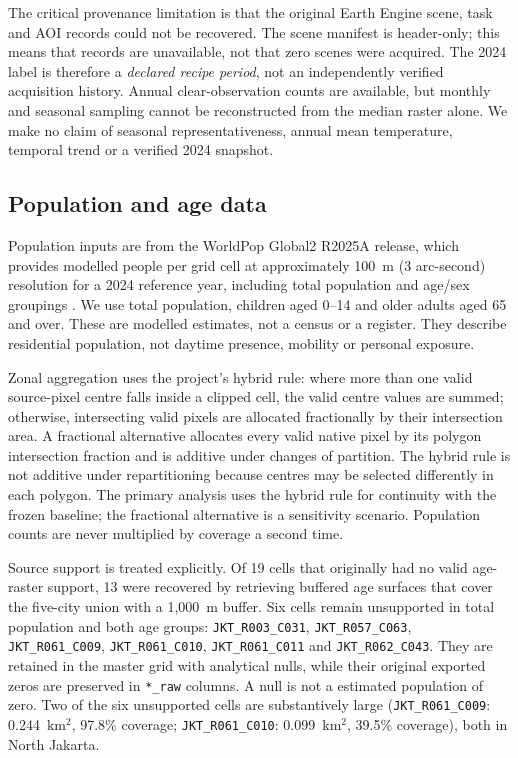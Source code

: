 \documentclass[times,twoside]{_Templates/MultiTargetManuscript}
\begin{document}
The critical provenance limitation is that the original Earth Engine scene,
task and AOI records could not be recovered. The scene manifest is header-only;
this means that records are unavailable, not that zero scenes were acquired.
The 2024 label is therefore a \emph{declared recipe period}, not an
independently verified acquisition history. Annual clear-observation counts are
available, but monthly and seasonal sampling cannot be reconstructed from the
median raster alone. We make no claim of seasonal representativeness, annual mean
temperature, temporal trend or a verified 2024 snapshot.

\subsection{Population and age data}

Population inputs are from the WorldPop Global2 R2025A release, which provides
modelled people per grid cell at approximately 100~m (3 arc-second) resolution
for a 2024 reference year, including total population and age/sex groupings
\citep{worldpop2025}. We use total population, children aged 0--14 and older
adults aged 65 and over. These are modelled estimates, not a census or a
register. They describe residential population, not daytime presence, mobility
or personal exposure.

Zonal aggregation uses the project's hybrid rule: where more than one valid
source-pixel centre falls inside a clipped cell, the valid centre values are
summed; otherwise, intersecting valid pixels are allocated fractionally by
their intersection area. A fractional alternative allocates every valid native
pixel by its polygon intersection fraction and is additive under changes of
partition. The hybrid rule is not additive under repartitioning because centres
may be selected differently in each polygon. The primary analysis uses the
hybrid rule for continuity with the frozen baseline; the fractional alternative
is a sensitivity scenario. Population counts are never multiplied by coverage a
second time.

Source support is treated explicitly. Of 19 cells that originally had no valid
age-raster support, 13 were recovered by retrieving buffered age surfaces that
cover the five-city union with a 1,000~m buffer. Six cells remain unsupported in
total population and both age groups:
\texttt{JKT\_R003\_C031}, \texttt{JKT\_R057\_C063},
\texttt{JKT\_R061\_C009}, \texttt{JKT\_R061\_C010},
\texttt{JKT\_R061\_C011} and \texttt{JKT\_R062\_C043}. They are retained in the
master grid with analytical nulls, while their original exported zeros are
preserved in \texttt{*\_raw} columns. A null is not a estimated population of
zero. Two of the six unsupported cells are substantively large
(\texttt{JKT\_R061\_C009}: 0.244~km$^2$, 97.8\% coverage;
\texttt{JKT\_R061\_C010}: 0.099~km$^2$, 39.5\% coverage), both in North Jakarta.
\end{document}
